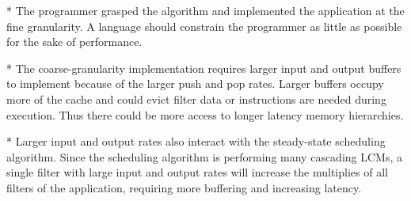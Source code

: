 * The programmer grasped the algorithm and implemented the application
at the fine granularity.  A language should constrain the programmer
as little as possible for the sake of performance.

* The coarse-granularity implementation requires larger input and
output buffers to implement because of the larger push and pop rates.
Larger buffers occupy more of the cache and could evict filter data or
instructions are needed during execution.  Thus there could be more
access to longer latency memory hierarchies.

* Larger input and output rates also interact with the steady-state
scheduling algorithm.  Since the scheduling algorithm is performing
many cascading LCMs, a single filter with large input and output rates
will increase the multiplies of all filters of the application,
requiring more buffering and increasing latency.